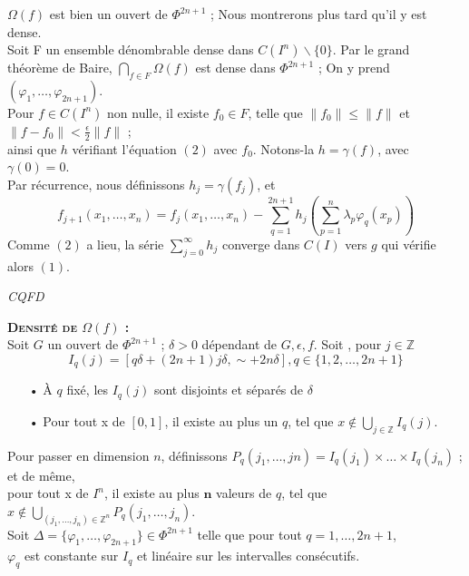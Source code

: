 \documentclass[a4paper]{article}
\begin{document}
$\Omega(f)$ est bien un ouvert de $\Phi ^{2n+1}$ ; Nous montrerons plus tard qu'il y est dense. \\

Soit F un ensemble dénombrable dense dans $C(I^n)\backslash\{0\}$. Par le grand théorème de Baire,
$\bigcap_{f \in F} \Omega(f)$ est dense dans $\Phi^{2n+1}$ ; On y prend $(\varphi_1,…,\varphi_{2n+1})$.\\
Pour $f \in C(I^n)$ non nulle, il existe $f_0 \in F$, telle que $\|f_0\| \leqslant \|f\|$ et $\|f-f_0\| < \frac{\epsilon}{2} \|f\|$ ; \\ainsi que $h$ vérifiant l'équation $(2)$ avec $f_0$. Notons-la $h= \gamma(f)$, avec $\gamma(0)=0$.\\
Par récurrence, nous définissons $h_j = \gamma(f_j)$, et
\[f_{j+1}(x_1,…,x_n)= f_j(x_1,…, x_n) - \sum_{q=1}^{2n+1} h_j\left( \sum_{p=1}^n \lambda_p \varphi_q(x_p)\right) \]
Comme $(2)$ a lieu, la série $\sum_{j=0}^\infty h_j$ converge dans $C(I)$ vers $g$ qui vérifie alors $(1)$.\\
\begin{flushright} \textit{CQFD} \\\end{flushright}

\textbf{\textsc{Densité de $\Omega(f)$ :}}\\

Soit $G$ un ouvert de $\Phi^{2n+1}$ ; $\delta>0$ dépendant de $G, \epsilon, f$. Soit , pour $j \in \mathbb{Z}$
\[I_q(j)=[q\delta + (2n+1)j\delta, \sim + 2n\delta], q \in \{1, 2,…, 2n+1\} \]
\begin{itemize}
\item[•] À $q$ fixé, les $I_q(j)$ sont disjoints et séparés de $\delta$
\item[•] Pour tout x de $[0,1]$, il existe au plus un $q$, tel que $ x \notin \bigcup_{j \in \mathbb{Z}} I_q(j)$.\\
\end{itemize}

Pour passer en dimension $n$, définissons $P_q(j_1,…,jn)=I_q(j_1)\times…\times I_q(j_n)$ ; et de même,\\
pour tout x de $I^n$, il existe au plus $\mathbf{n}$ valeurs de $q$, tel que $ x \notin \bigcup_{(j_1,…,j_n) \in \mathbb{Z}^n} P_q(j_1,…,j_n)$.\\

Soit $\Delta = \{\varphi_1,…, \varphi_{2n+1}\} \in \Phi^{2n+1}$ telle que pour tout $q=1,…,2n+1$,\\
$\varphi_q$ est constante sur $I_q$ et linéaire sur les intervalles consécutifs.\\
\end{document}
